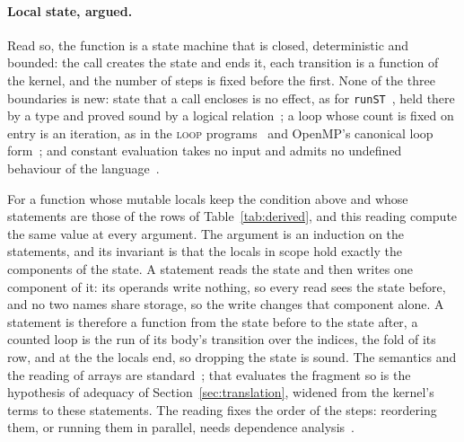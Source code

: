 \paragraph{Local state, argued.}
Read so, the function is a state machine that is closed, deterministic and bounded: the call creates the state and ends it, each transition is a function of the kernel, and the number of steps is fixed before the first.
None of the three boundaries is new: state that a call encloses is no effect, as for \texttt{runST}~\cite{launchbury1994lazy}, held there by a type and proved sound by a logical relation~\cite{timany2018logical}; a loop whose count is fixed on entry is an iteration, as in the \textsc{loop} programs~\cite{meyer1967loop} and OpenMP's canonical loop form~\cite{openmp2024spec}; and constant evaluation takes no input and admits no undefined behaviour of the language~\cite[\texttt{expr.const}]{cpp23standard}.

For a  function whose mutable locals keep the condition above and whose statements are those of the rows of Table~\ref{tab:derived}, \Cpp{} and this reading compute the same value at every argument.
The argument is an induction on the statements, and its invariant is that the locals in scope hold exactly the components of the state.
A statement reads the state and then writes one component of it: its operands write nothing, so every read sees the state before, and no two names share storage, so the write changes that component alone.
A statement is therefore a function from the state before to the state after, a counted loop is the run of its body's transition over the indices, the fold of its row, and at the  the locals end, so dropping the state is sound.
The semantics and the reading of arrays are standard~\cite{reynolds1998theories,cytron1991ssa,appel1998ssa}; that \Cpp{} evaluates the fragment so is the hypothesis of adequacy of Section~\ref{sec:translation}, widened from the kernel's terms to these statements.
The reading fixes the order of the steps: reordering them, or running them in parallel, needs dependence analysis~\cite{allen2001optimizing,knobe1998array}.
